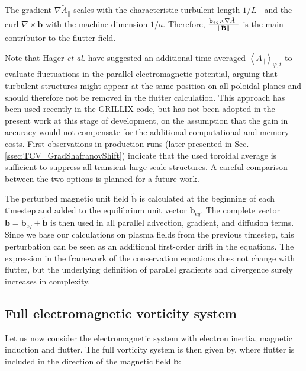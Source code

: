 The gradient $\nabla \tilde{A}_\parallel$ scales with the characteristic turbulent length $1/L_\perp$ and the curl $\nabla \times \mathbf{b}$ with the machine dimension $1/a$. Therefore, $\frac{\mathbf{b}_{eq} \times \nabla \tilde{A}_\parallel}{\norm{\mathbf{B}}}$ is the main contributor to the flutter field.

Note that Hager \emph{et al.}\cite{hager2022} have suggested an additional time-averaged $\left<A_\parallel\right>_{\varphi,t}$ to evaluate fluctuations in the parallel electromagnetic potential, arguing that turbulent structures might appear at the same position on all poloidal planes and should therefore not be removed in the flutter calculation. This approach has been used recently  in the GRILLIX code\cite{zhang2024}, but has not been adopted in the present work at this stage of development, on the assumption that the gain in accuracy would not compensate for the additional computational and memory costs. First observations in production runs (later presented in Sec. \ref{ssec:TCV_GradShafranovShift}) indicate that the used toroidal average is sufficient to suppress all transient large-scale structures. A careful comparison between the two options is planned for a future work. 

The perturbed magnetic unit field $\tilde{\mathbf{b}}$ is calculated at the beginning of each timestep and added to the equilibrium unit vector $\mathbf{b}_{eq}$. The complete vector $\mathbf{b} = \mathbf{b}_{eq} + \tilde{\mathbf{b}}$ is then used in all parallel advection, gradient, and diffusion terms. Since we base our calculations on plasma fields from the previous timestep, this perturbation can be seen as an additional first-order drift in the equations. The expression in the framework of the conservation equations does not change with flutter, but the underlying definition of parallel gradients and divergence surely increases in complexity. \\


\subsection{Full electromagnetic vorticity system}
\label{sec:S3X_formulationEMsystem}


Let us now consider the electromagnetic system with electron inertia, magnetic induction and flutter. The full vorticity system is then given by, where flutter is included in the direction of the magnetic field $\textbf{b}$: 

